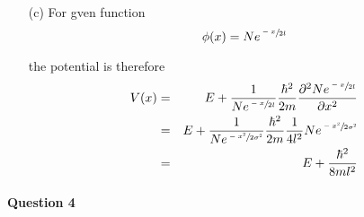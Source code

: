 \documentclass[11pt,a4paper]{article}
\begin{document}
\begin{enumerate}
\item[(c)]
    For gven function
    \begin{equation}
        \phi(x)=Ne^{\sfrac{-x}{2l}}
    \end{equation}

    the potential is therefore
    \begin{eqnarray}
        V(x)
        &=&E+\frac{1}{Ne^{\sfrac{-x}{2l}}}\frac{\hbar^2}{2m}\frac{\partial^2Ne^{\sfrac{-x}{2l}}}{\partial x^2}\\
        &=&E+\frac{1}{Ne^{\sfrac{-x^2}{2\sigma^2}}}\frac{\hbar^2}{2m}\frac{1}{4l^2}Ne^{\sfrac{-x^2}{2\sigma^2}}\\
        &=&E+\frac{\hbar^2}{8ml^2}\\
    \end{eqnarray}

\end{enumerate}

\newpage

\paragraph*{Question 4}
\end{document}
